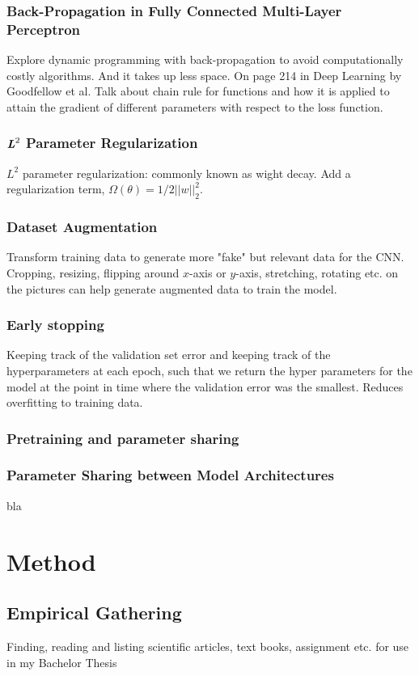 \documentclass[a4paper,11pt]{article}
\begin{document}
\subsubsection{Back-Propagation in Fully Connected Multi-Layer Perceptron}
Explore dynamic programming with back-propagation to avoid computationally costly algorithms. And it takes up less space. On page 214 in Deep Learning by Goodfellow et al. Talk about chain rule for functions and how it is applied to attain the gradient of different parameters with respect to the loss function. 
\subsubsection{$\textbf{\textit{L}}^2$ Parameter Regularization}
$L^2$ parameter regularization: commonly known as wight decay. Add a regularization term, $\Omega(\theta)=1/2||w||_2^2$. 
\subsubsection{Dataset Augmentation}
Transform training data to generate more "fake" but relevant data for the CNN. Cropping, resizing, flipping around $x$-axis or $y$-axis, stretching, rotating etc. on the pictures can help generate augmented data to train the model. 
\subsubsection{Early stopping}
Keeping track of the validation set error and keeping track of the hyperparameters at each epoch, such that we return the hyper parameters for the model at the point in time where the validation error was the smallest. Reduces overfitting to training data. 
\subsubsection{Pretraining and parameter sharing}
\subsubsection{Parameter Sharing between Model Architectures}
bla
\section{Method}
\subsection{Empirical Gathering}
Finding, reading and listing scientific articles, text books, assignment etc. for use in my Bachelor Thesis 
\end{document}
